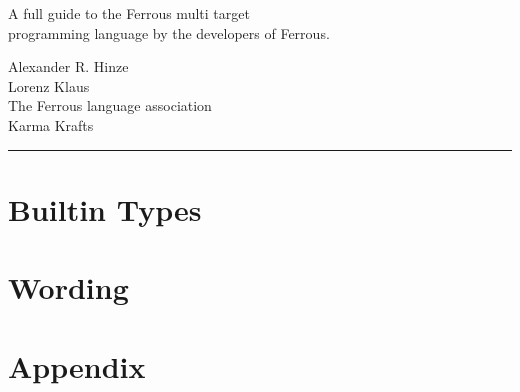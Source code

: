 \documentclass[11pt]{article}
\begin{document}
\begin{titlepage}
{{{{                        \vspace{0.7cm} %
                    }
                }
            }
        }
        \setlength{\fboxrule}{1pt}

        \begin{center}
            \fontsize{16}{0} \selectfont
            A full guide to the Ferrous multi target\\
            programming language by the developers of Ferrous.
            \normalfont \selectfont
        \end{center}

        \vfill %

        \parbox[t]{0.93 \textwidth}{ %
            \raggedleft %
            \large %
            {\Large Alexander R. Hinze}\\[4pt] %
            {\Large Lorenz Klaus}\\[4pt] %
            The Ferrous language association\\
            Karma Krafts

            \hfill \rule {0.2 \linewidth}{1pt} %
        }
    \end{titlepage}

    \tableofcontents \newpage


    \section{Builtin Types} \label{sec:builtin-types}
    
    \newpage


    \section{Wording} \label{sec:wording}
    
    \newpage


    \section{Appendix} \label{sec:appendix}
    
\end{document}
